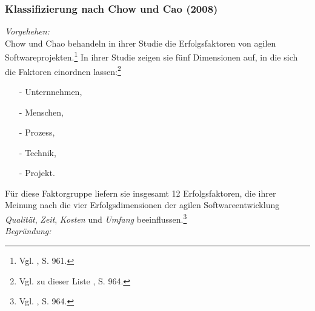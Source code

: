 \noindent
\subsubsection{Klassifizierung nach Chow und Cao (2008)}
\textit{Vorgehehen:}\\\noindent
Chow und Chao behandeln in ihrer Studie die Erfolgsfaktoren von agilen Softwareprojekten.\footnote{Vgl. \cite{Chow.2008}, S. 961.}
In ihrer Studie zeigen sie fünf Dimensionen auf, in die sich die Faktoren einordnen lassen:\footnote{Vgl. zu dieser Liste \cite{Chow.2008}, S. 964.}
\begin{itemize}\itemsep0pt
\item[-]Unternnehmen,
\item[-]Menschen,
\item[-]Prozess,
\item[-]Technik,
\item[-]Projekt.
\end{itemize}
Für diese Faktorgruppe liefern sie insgesamt 12 Erfolgsfaktoren, die ihrer Meinung nach die vier Erfolgsdimensionen der agilen Softwareentwicklung \textit{Qualität}, \textit{Zeit}, \textit{Kosten} und \textit{Umfang} beeinflussen.\footnote{Vgl. \cite{Chow.2008}, S. 964.}
\\\noindent
\textit{Begründung:}\\\noindent
